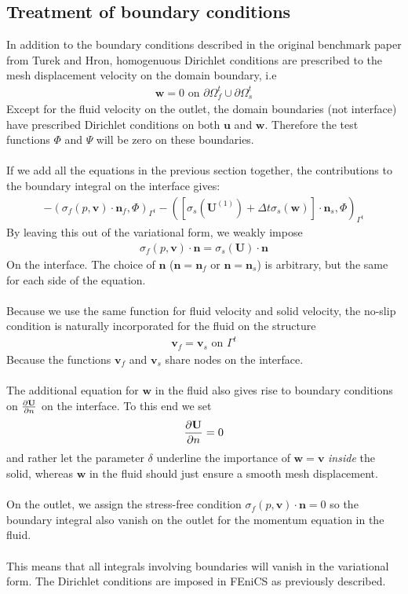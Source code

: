 \subsection{Treatment of boundary conditions}
In addition to the boundary conditions described in the original benchmark paper from Turek and Hron, homogenuous Dirichlet conditions are prescribed to the mesh displacement velocity on the domain boundary, i.e 
\begin{align} 
\mathbf{w} = 0 \text{ on } \partial \Omega_f^t \cup \partial \Omega_s^t
\end{align}
Except for the fluid velocity on the outlet, the domain boundaries (not interface) have prescribed Dirichlet conditions on both $\mathbf{u}$ and $\mathbf{w}$. Therefore the test functions $\Phi$ and $\Psi$ will be zero on these boundaries. \\ \\
If we add all the equations in the previous section together, the contributions to the boundary integral on the interface gives:
\begin{align}- (\sigma_f(p,\mathbf{v}) \cdot \mathbf{n}_f, \Phi)_{\Gamma^t} - ([\sigma_s(\mathbf{U}^{(1)}) + \Delta t \sigma_s(\mathbf{w})]\cdot \mathbf{n}_s, \Phi)_{\Gamma^t}
\end{align}
By leaving this out of the variational form, we weakly impose
\begin{align} \sigma_f(p,\mathbf{v}) \cdot \mathbf{n} = \sigma_s(\mathbf{U}) \cdot \mathbf{n}
\end{align}
On the interface. The choice of $\mathbf{n}$ ($\mathbf{n} = \mathbf{n}_f$ or $\mathbf{n} = \mathbf{n}_s$) is arbitrary, but the same for each side of the equation. \\
\\
Because we use the same function for fluid velocity and solid velocity, the no-slip condition is naturally incorporated for the fluid on the structure
\begin{align}
\mathbf{v}_f = \mathbf{v}_s \text{ on } \Gamma^t
\end{align}
Because the functions $\mathbf{v}_f$ and $\mathbf{v}_s$ share nodes on the interface.
\\
\\
The additional equation for $\mathbf{w}$ in the fluid also gives rise to boundary conditions on $\frac{\partial \mathbf{U}}{\partial n}$ on the interface. To this end we set 
\begin{align}
\frac{\partial \mathbf{U}}{\partial n} = 0
\end{align}
and rather let the parameter $\delta$ underline the importance of $\mathbf{w} = \mathbf{v}$ \textit{inside} the solid, whereas $\mathbf{w}$ in the fluid should just ensure a smooth mesh displacement. \\
\\
On the outlet, we assign the stress-free condition $\sigma_f(p,\mathbf{v}) \cdot \mathbf{n} = 0$ so the boundary integral also vanish on the outlet for the momentum equation in the fluid. 
\\
\\
This means that all integrals involving boundaries will vanish in the variational form. The Dirichlet conditions are imposed in FEniCS as previously described.


